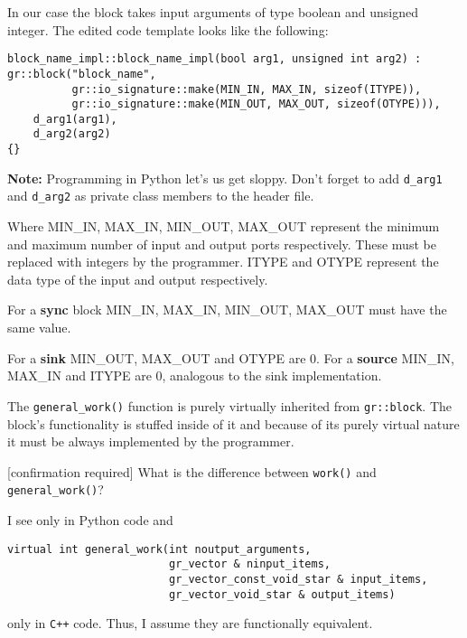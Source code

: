 \documentclass{article}
\begin{document}
In our case the block takes input arguments of type boolean and unsigned integer. The edited code template looks like the following:

\begin{verbatim}
block_name_impl::block_name_impl(bool arg1, unsigned int arg2) :
gr::block("block_name",
		  gr::io_signature::make(MIN_IN, MAX_IN, sizeof(ITYPE)),
		  gr::io_signature::make(MIN_OUT, MAX_OUT, sizeof(OTYPE))),
	d_arg1(arg1),
	d_arg2(arg2)
{}
\end{verbatim}

\textbf{Note:} Programming in Python let's us get sloppy. Don't forget to add \verb|d_arg1| and \verb|d_arg2| as private class members to the header file.

\bigskip

Where MIN\_IN, MAX\_IN, MIN\_OUT, MAX\_OUT represent the minimum and maximum number of input and output ports respectively. These must be replaced with integers by the programmer. ITYPE and OTYPE represent the data type of the input and output respectively.

\medskip

For a \textbf{sync} block MIN\_IN, MAX\_IN, MIN\_OUT, MAX\_OUT must have the same value.

\medskip

For a \textbf{sink} MIN\_OUT, MAX\_OUT and OTYPE are 0. 
For a \textbf{source} MIN\_IN, MAX\_IN and ITYPE are 0, analogous to the sink implementation. 

\bigskip

The \verb|general_work()| function is purely virtually inherited from \verb|gr::block|. The block's functionality is stuffed inside of it and because of its purely virtual nature it must be always implemented by the programmer.

\bigskip

\color{blue}
[confirmation required] What is the difference between \verb|work()| and \verb|general_work()|? 

\medskip

I see  only in Python code and 

\begin{verbatim}
virtual int general_work(int noutput_arguments, 
						 gr_vector & ninput_items, 
						 gr_vector_const_void_star & input_items,
						 gr_vector_void_star & output_items)
\end{verbatim}

only in \texttt{C++} code. Thus, I assume they are functionally equivalent.
\end{document}
